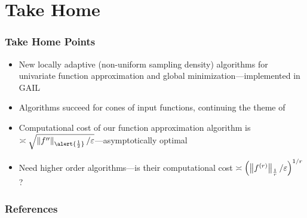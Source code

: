 \documentclass[12pt,compress,xcolor={usenames,dvipsnames}]{beamer} %
\begin{document}
\section{Take Home}
\begin{frame}
	\frametitle{Take Home Points }
	\vspace{-2ex}
\begin{itemize}
	\item New \alert{locally} adaptive (non-uniform sampling density)  algorithms for univariate function approximation and global minimization---implemented in GAIL \cite{ChoEtAl15a}
	
	\item Algorithms succeed for \alert{cones} of input functions, continuing the theme of \cites{HicEtal14a,HicEtal14b,Ton14a,Din15a,Jia16a}
	
	\item Computational cost of our function approximation algorithm is $\asymp \sqrt{\norm[\alert{\frac12}]{f''}/\varepsilon}$---asymptotically optimal
	
	\item Need \alert{higher order} algorithms---is their computational cost $\asymp \left(\norm[\frac1r]{f^{(r)}}/\varepsilon\right)^{1/r}$?
	
	
	\end{itemize}
	
	\bigskip
	
	
\end{frame}

\begin{frame}[allowframebreaks]\frametitle{References}
	
\end{frame}
\end{document}
